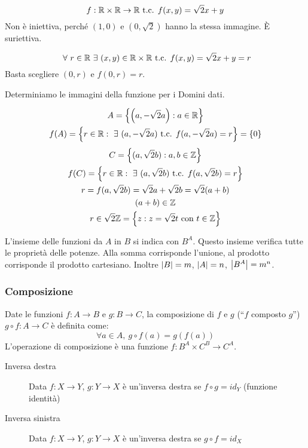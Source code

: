 \[
f: \mathbb{R} \times \mathbb{R} \to \mathbb{R} \text{ t.c. } f(x,y) = \sqrt{2}x + y
\] 
Non \`e iniettiva, perch\'e $(1,0)$ e $(0,\sqrt{2})$ hanno la stessa immagine. \`E suriettiva.

\[
\forall r \in \reals \exists (x,y) \in \reals \times \reals \text{ t.c. } f(x,y) = \sqrt{2} x + y = r
\]
Basta scegliere $(0,r)$ e $f(0,r) = r$.

Determiniamo le immagini della funzione per i Domini dati.

\begin{gather*}
A = \left\{ \left( a, - \sqrt{2}a\right) : a \in \reals  \right\} \\
f(A) = \left\{ r \in \reals : \exists (a, - \sqrt{2}a) \text{ t.c. } f(a, - \sqrt{2} a) = r \right\} = \left\{ 0 \right\}
\end{gather*}
\begin{gather*}
C = \left\{ (a, \sqrt{2} b) : a, b \in \integers \right\} \\
f(C) = \left\{ r \in \reals : \exists (a, \sqrt{2} b) \text{ t.c. } f(a, \sqrt{2}b) = r \right\} \\
r = f(a, \sqrt{2} b) = \sqrt{2} a + \sqrt{2} b = \sqrt{2} (a + b) \\
(a+b) \in \integers \\
r \in \sqrt{2} \integers = \left\{z : z = \sqrt{2} t \text{ con } t \in \integers \right\}
\end{gather*}

L'insieme delle funzioni da $A$ in $B$ si indica con $B^A$. Questo insieme verifica tutte le propriet\`a delle potenze. Alla somma corrisponde l'unione, al prodotto corrisponde il prodotto cartesiano. Inoltre $\left\lvert{B}\right\rvert = m$, $\left\lvert{A}\right\rvert = n$, $\left\lvert{B^A}\right\rvert = m^n$.

\subsubsection{Composizione}

Date le funzioni $f : A \to B$ e $g : B \to C$, la composizione di $f$ e $g$ (``$f$ composto $g$'') $g \circ f : A \to C$ \`e definita come:
\[
\forall a \in A , \ {g \circ f}(a) = g(f(a))
\]
L'operazione di composizione \`e una funzione $f : B^A \times C^B \to C^A$.

\begin{description}
  \item[Inversa destra] Data $f : X \to Y$, $g : Y \to X$ \`e un'inversa destra se $f \circ g = id_Y$ (funzione identit\`a)
  \item[Inversa sinistra] Data $f : X \to Y$, $g : Y \to X$ \`e un'inversa destra se $g \circ f = id_X$
\end{description}

